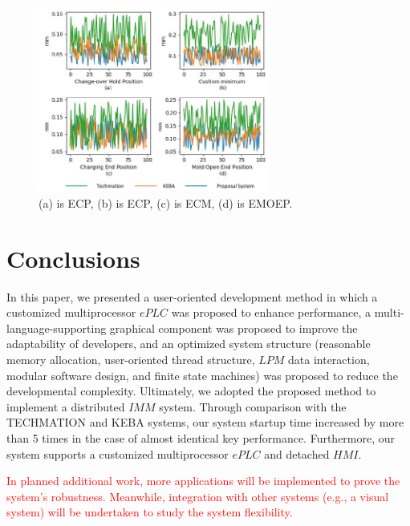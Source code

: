 \documentclass[journal,UTF8]{IEEEtran}
\begin{document}
	\begin{figure}
		\centering
		\includegraphics[width=3in]{fig/Compare.pdf}
		\caption{(a) is ECP, (b) is ECP, (c) is ECM, (d) is EMOEP.}
		\label{fig:Compare}
	\end{figure}
	
	\section{Conclusions}
	\label{conclusion}
	In this paper, we presented a user-oriented development method in which a customized multiprocessor $ePLC$ was proposed to enhance performance, a multi-language-supporting graphical component was proposed to improve the adaptability of developers, and an optimized system structure (reasonable memory allocation, user-oriented thread structure, $LPM$ data interaction, modular software design, and finite state machines) was proposed to reduce the developmental complexity. Ultimately, we adopted the proposed method to implement a distributed $IMM$ system. Through comparison with the TECHMATION and KEBA systems, our system startup time increased by more than 5 times in the case of almost identical key performance. Furthermore, our system supports a customized multiprocessor $ePLC$ and detached $HMI$. 
	
	\textcolor{red}{In planned additional work, more applications will be implemented to prove the system's robustness. Meanwhile, integration with other systems (e.g., a visual system) will be undertaken to study the system flexibility.} 
	
	
	
	
	
	\ifCLASSOPTIONcaptionsoff
	\newpage
	\fi
	
	
	
	
\end{document}
